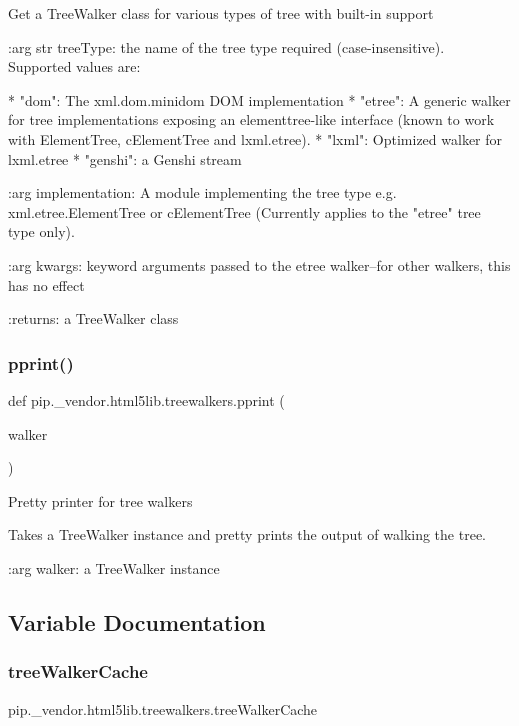 \begin{DoxyVerb}Get a TreeWalker class for various types of tree with built-in support

:arg str treeType: the name of the tree type required (case-insensitive).
    Supported values are:

    * "dom": The xml.dom.minidom DOM implementation
    * "etree": A generic walker for tree implementations exposing an
      elementtree-like interface (known to work with ElementTree,
      cElementTree and lxml.etree).
    * "lxml": Optimized walker for lxml.etree
    * "genshi": a Genshi stream

:arg implementation: A module implementing the tree type e.g.
    xml.etree.ElementTree or cElementTree (Currently applies to the "etree"
    tree type only).

:arg kwargs: keyword arguments passed to the etree walker--for other
    walkers, this has no effect

:returns: a TreeWalker class\end{DoxyVerb}
 \mbox{\label{namespacepip_1_1__vendor_1_1html5lib_1_1treewalkers_a97bbd349deba74525c5ede6f1db95596}} 
\subsubsection{\texorpdfstring{pprint()}{pprint()}}
{\footnotesize\ttfamily def pip.\+\_\+vendor.\+html5lib.\+treewalkers.\+pprint (\begin{DoxyParamCaption}\item[{}]{walker }\end{DoxyParamCaption})}

\begin{DoxyVerb}Pretty printer for tree walkers

Takes a TreeWalker instance and pretty prints the output of walking the tree.

:arg walker: a TreeWalker instance\end{DoxyVerb}
 

\subsection{Variable Documentation}
\mbox{\label{namespacepip_1_1__vendor_1_1html5lib_1_1treewalkers_a55d556756856eebe0f8e79ece5d07858}} 
\subsubsection{\texorpdfstring{tree\+Walker\+Cache}{treeWalkerCache}}
{\footnotesize\ttfamily pip.\+\_\+vendor.\+html5lib.\+treewalkers.\+tree\+Walker\+Cache}

